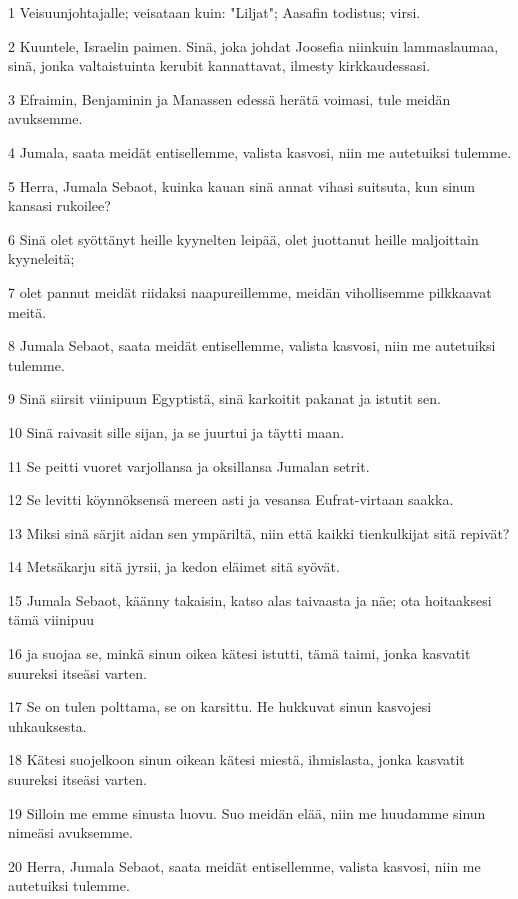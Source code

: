 \par 1 Veisuunjohtajalle; veisataan kuin: "Liljat"; Aasafin todistus; virsi.
\par 2 Kuuntele, Israelin paimen. Sinä, joka johdat Joosefia niinkuin lammaslaumaa, sinä, jonka valtaistuinta kerubit kannattavat, ilmesty kirkkaudessasi.
\par 3 Efraimin, Benjaminin ja Manassen edessä herätä voimasi, tule meidän avuksemme.
\par 4 Jumala, saata meidät entisellemme, valista kasvosi, niin me autetuiksi tulemme.
\par 5 Herra, Jumala Sebaot, kuinka kauan sinä annat vihasi suitsuta, kun sinun kansasi rukoilee?
\par 6 Sinä olet syöttänyt heille kyynelten leipää, olet juottanut heille maljoittain kyyneleitä;
\par 7 olet pannut meidät riidaksi naapureillemme, meidän vihollisemme pilkkaavat meitä.
\par 8 Jumala Sebaot, saata meidät entisellemme, valista kasvosi, niin me autetuiksi tulemme.
\par 9 Sinä siirsit viinipuun Egyptistä, sinä karkoitit pakanat ja istutit sen.
\par 10 Sinä raivasit sille sijan, ja se juurtui ja täytti maan.
\par 11 Se peitti vuoret varjollansa ja oksillansa Jumalan setrit.
\par 12 Se levitti köynnöksensä mereen asti ja vesansa Eufrat-virtaan saakka.
\par 13 Miksi sinä särjit aidan sen ympäriltä, niin että kaikki tienkulkijat sitä repivät?
\par 14 Metsäkarju sitä jyrsii, ja kedon eläimet sitä syövät.
\par 15 Jumala Sebaot, käänny takaisin, katso alas taivaasta ja näe; ota hoitaaksesi tämä viinipuu
\par 16 ja suojaa se, minkä sinun oikea kätesi istutti, tämä taimi, jonka kasvatit suureksi itseäsi varten.
\par 17 Se on tulen polttama, se on karsittu. He hukkuvat sinun kasvojesi uhkauksesta.
\par 18 Kätesi suojelkoon sinun oikean kätesi miestä, ihmislasta, jonka kasvatit suureksi itseäsi varten.
\par 19 Silloin me emme sinusta luovu. Suo meidän elää, niin me huudamme sinun nimeäsi avuksemme.
\par 20 Herra, Jumala Sebaot, saata meidät entisellemme, valista kasvosi, niin me autetuiksi tulemme.

